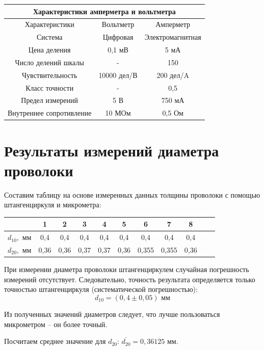\documentclass[a4paper, 12pt]{article} %
\begin{document}
\begin{center}
\begin{tabular}{|c|c|c|}
\hline 
\multicolumn{3}{|c|}{Характеристики амперметра и вольтметра} \\ 
\hline 
Характеристики & Вольтметр & Амперметр \\ 
\hline 
Система & Цифровая & Электромагнитная \\ 
\hline 
Цена деления & 0,1 мВ & 5 мА \\ 
\hline 
Число делений шкалы & - & 150 \\ 
\hline 
Чувствительность & 10000 дел/В & 200 дел/A \\ 
\hline 
Класс точности & - & 0,5 \\ 
\hline 
Предел измерений & 5 В & 750 мА \\ 
\hline 
Внутреннее сопротивление & 10 МОм & 0,5 Ом \\ 
\hline  
\end{tabular} 
\end{center} 
\newpage

\section{Результаты измерений диаметра проволоки}


Составим таблицу на основе измеренных данных толщины проволоки с помощью штангенциркуля и микрометра:

\begin{center}
\begin{tabular}{|c|c|c|c|c|c|c|c|c|c|c|}
\hline 
 & 1 & 2 & 3 & 4 & 5 & 6 & 7 & 8  \\ 
\hline 
$d_{10},$ мм & 0,4 & 0,4 & 0,4 & 0,4 & 0,4 & 0,4 & 0,4 & 0,4\\ 
\hline 
$d_{20},$ мм & 0,36 & 0,36 & 0,37 & 0,37 & 0,36 & 0,355 & 0,355 & 0,36\\ 
\hline 
\end{tabular} 
\end{center}

При измерении диаметра проволоки штангенциркулем случайная погрешность измерений отсутствует. Следовательно, точность результата определяется только точностью штангенциркуля (систематической погрешностью):
\[d_{10} = (0,4 \pm 0,05) \text{ мм}\]

Из полученных значений диаметров следует, что лучше пользоваться микрометром -- он более точный.

Посчитаем среднее значение для $d_{20}$: $\overline{d_{20}} = 0,36125$ мм.
\end{document}
